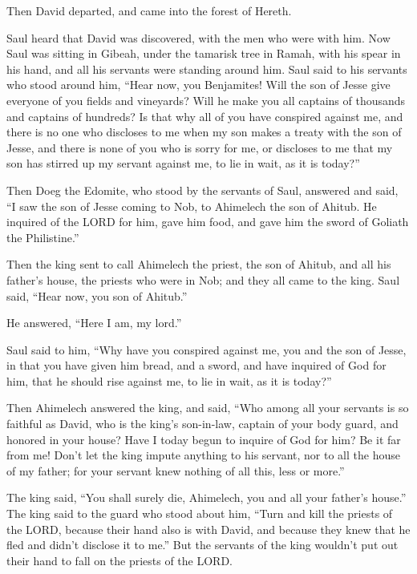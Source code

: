 Then David departed, and came into the forest of Hereth.

\myverse{}Saul heard that David was discovered, with the men who were with
him. Now Saul was sitting in Gibeah, under the tamarisk tree in Ramah, with his spear in his hand, and
all his servants were standing around him.
\myverse{}Saul said to his servants who stood around him, “Hear now, you Benjamites!
Will the son of Jesse give everyone of you fields and vineyards? Will he make you all captains of thousands
and captains of hundreds?
\myverse{}Is that why all of you have conspired against me, and there is no one who discloses
to me when my son makes a treaty with the son of Jesse, and there is none of you who is sorry for me,
or discloses to me that my son has stirred up my servant against me, to lie in wait, as it is today?”

\myverse{}Then Doeg the Edomite, who stood by the servants of Saul, answered
and said, “I saw the son of Jesse coming to Nob, to Ahimelech the son of Ahitub.
\myverse{}He inquired of the LORD for him, gave him food, and gave him the sword of
Goliath the Philistine.”

\myverse{}Then the king sent to call Ahimelech the priest, the son of
Ahitub, and all his father’s house, the priests who were in Nob; and they all came to the king.
\myverse{}Saul said, “Hear now, you son of Ahitub.”

He answered, “Here I am, my lord.”

\myverse{}Saul said to him, “Why have you conspired against me, you and
the son of Jesse, in that you have given him bread, and a sword, and have inquired of God for him, that
he should rise against me, to lie in wait, as it is today?”

\myverse{}Then Ahimelech answered the king, and said, “Who among all your
servants is so faithful as David, who is the king’s son-in-law, captain of your body guard, and honored
in your house?
\myverse{}Have I today begun to inquire of God for him? Be it far from me! Don’t let
the king impute anything to his servant, nor to all the house of my father; for your servant knew nothing
of all this, less or more.”

\myverse{}The king said, “You shall surely die, Ahimelech, you and all
your father’s house.”
\myverse{}The king said to the guard who stood about him, “Turn and kill the priests
of the LORD, because their hand also is with David, and because they knew that he fled and didn’t disclose
it to me.” But the servants of the king wouldn’t put out their hand to fall on the priests of the LORD.

